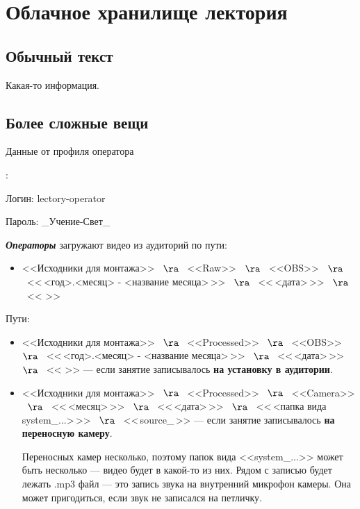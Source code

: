 \section{Облачное хранилище лектория}\label{sec:cloud-storage}

\subsection{Обычный текст}

Какая-то информация.

\subsection{Более сложные вещи}

\hypertarget{lectory-operator-profile}{Данные от профиля оператора}:
\par\hspace{10pt} Логин: lectory-operator
\vspace{-5pt}
\par\hspace{10pt} Пароль: \_Учение-Свет\_

\vspace{5pt}

\textit{\textbf{Операторы}} загружают видео из аудиторий по пути:
\begin{itemize}
  \item <<Исходники для монтажа>> \ $\ra$ \ <<Raw>> \ $\ra$ \ <<OBS>> \ $\ra$ \ <<\,<год>.<месяц> - <название месяца>\,>> \ $\ra$ \ <<\,<дата>\,>> \ $\ra$ \ <<\,<название предмета и ФИО лектора>\,>>
\end{itemize}

Пути:
\begin{itemize}
  \item <<Исходники для монтажа>> \ $\ra$ \ <<Processed>> \ $\ra$ \ <<OBS>> \ $\ra$ \ <<\,<год>.<месяц> - <название месяца>\,>> \ $\ra$ \ <<\,<дата>\,>> \ $\ra$ \ <<\,<название предмета и ФИО лектора>\,>> --- если занятие записывалось \textbf{на установку в аудитории}.

  \item <<Исходники для монтажа>> \ $\ra$ \ <<Processed>> \ $\ra$ \ <<Camera>> \ $\ra$ \ <<\,<месяц>\,>> \ $\ra$ \ <<\,<дата>\,>> \ $\ra$ \ <<\,<папка вида system\_...>\,>> \ $\ra$ \ <<\,source\_<время лекции>\,>> --- если занятие записывалось \textbf{на переносную камеру}.

        Переносных камер несколько, поэтому папок вида <<system\_...>> может быть несколько --- видео будет в какой-то из них. Рядом с записью будет лежать \textsf{.mp3} файл --- это запись звука на внутренний микрофон камеры. Она может пригодиться, если звук не записался на петличку.
\end{itemize}

